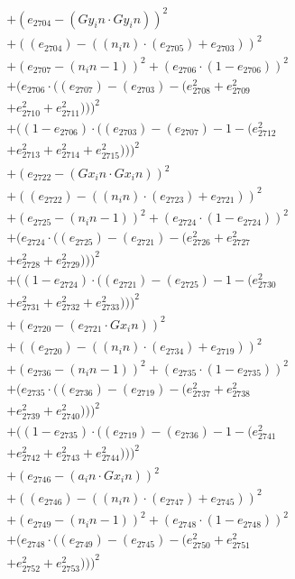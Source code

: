 \documentclass[10pt, a4paper]{article}
\begin{document}
\begin{align*}
& + (e_{2704} - (Gy_in  \cdot  Gy_in))^{2} \\
& + ((e_{2704}) - ((n_in)  \cdot  (e_{2705}) + e_{2703}))^{2} \\
& + (e_{2707} - (n_in - 1))^{2} + (e_{2706}  \cdot  (1 - e_{2706}))^{2} \\
& + (e_{2706}  \cdot  ((e_{2707}) - (e_{2703}) - (e_{2708}^{2} + e_{2709}^{2} \\
& + e_{2710}^{2} + e_{2711}^{2})))^{2} \\
& + ((1 - e_{2706})  \cdot  ((e_{2703}) - (e_{2707}) - 1 - (e_{2712}^{2} \\
& + e_{2713}^{2} + e_{2714}^{2} + e_{2715}^{2})))^{2} \\
& + (e_{2722} - (Gx_in  \cdot  Gx_in))^{2} \\
& + ((e_{2722}) - ((n_in)  \cdot  (e_{2723}) + e_{2721}))^{2} \\
& + (e_{2725} - (n_in - 1))^{2} + (e_{2724}  \cdot  (1 - e_{2724}))^{2} \\
& + (e_{2724}  \cdot  ((e_{2725}) - (e_{2721}) - (e_{2726}^{2} + e_{2727}^{2} \\
& + e_{2728}^{2} + e_{2729}^{2})))^{2} \\
& + ((1 - e_{2724})  \cdot  ((e_{2721}) - (e_{2725}) - 1 - (e_{2730}^{2} \\
& + e_{2731}^{2} + e_{2732}^{2} + e_{2733}^{2})))^{2} \\
& + (e_{2720} - (e_{2721}  \cdot  Gx_in))^{2} \\
& + ((e_{2720}) - ((n_in)  \cdot  (e_{2734}) + e_{2719}))^{2} \\
& + (e_{2736} - (n_in - 1))^{2} + (e_{2735}  \cdot  (1 - e_{2735}))^{2} \\
& + (e_{2735}  \cdot  ((e_{2736}) - (e_{2719}) - (e_{2737}^{2} + e_{2738}^{2} \\
& + e_{2739}^{2} + e_{2740}^{2})))^{2} \\
& + ((1 - e_{2735})  \cdot  ((e_{2719}) - (e_{2736}) - 1 - (e_{2741}^{2} \\
& + e_{2742}^{2} + e_{2743}^{2} + e_{2744}^{2})))^{2} \\
& + (e_{2746} - (a_in  \cdot  Gx_in))^{2} \\
& + ((e_{2746}) - ((n_in)  \cdot  (e_{2747}) + e_{2745}))^{2} \\
& + (e_{2749} - (n_in - 1))^{2} + (e_{2748}  \cdot  (1 - e_{2748}))^{2} \\
& + (e_{2748}  \cdot  ((e_{2749}) - (e_{2745}) - (e_{2750}^{2} + e_{2751}^{2} \\
& + e_{2752}^{2} + e_{2753}^{2})))^{2} \\

\end{align*}
\end{document}
